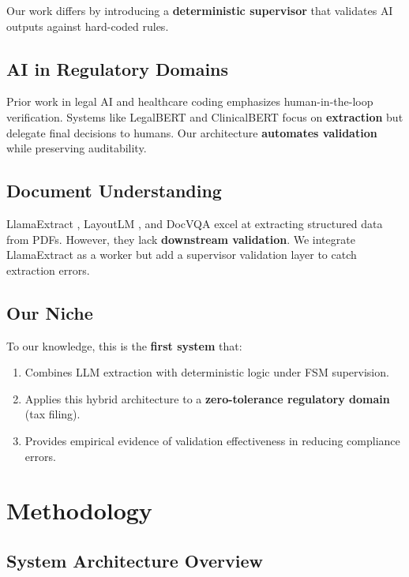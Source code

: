 \documentclass[conference]{IEEEtran}
\begin{document}
Our work differs by introducing a \textbf{deterministic supervisor} that validates AI outputs against hard-coded rules.

\subsection{AI in Regulatory Domains}

Prior work in legal AI \cite{rasiah2023legal} and healthcare coding \cite{zhang2022biogpt} emphasizes human-in-the-loop verification. Systems like LegalBERT \cite{chalkidis2020legalbert} and ClinicalBERT \cite{alsentzer2019clinicalbert} focus on \textbf{extraction} but delegate final decisions to humans. Our architecture \textbf{automates validation} while preserving auditability.

\subsection{Document Understanding}

LlamaExtract \cite{llamaindex2024extract}, LayoutLM \cite{xu2020layoutlm}, and DocVQA \cite{mathew2021docvqa} excel at extracting structured data from PDFs. However, they lack \textbf{downstream validation}. We integrate LlamaExtract as a worker but add a supervisor validation layer to catch extraction errors.

\subsection{Our Niche}

To our knowledge, this is the \textbf{first system} that:

\begin{enumerate}
    \item Combines LLM extraction with deterministic logic under FSM supervision.
    \item Applies this hybrid architecture to a \textbf{zero-tolerance regulatory domain} (tax filing).
    \item Provides empirical evidence of validation effectiveness in reducing compliance errors.
\end{enumerate}

\section{Methodology}
\label{sec:methodology}

\subsection{System Architecture Overview}
\end{document}
